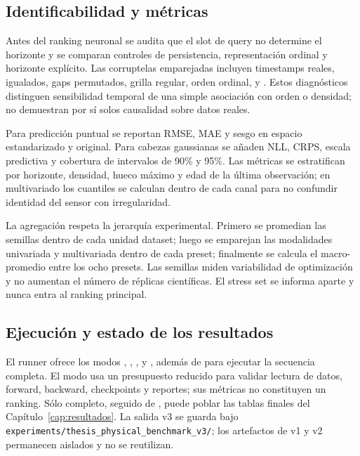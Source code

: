 \subsection{Identificabilidad y métricas}

Antes del ranking neuronal se audita que el slot de query no determine el horizonte y se comparan controles de persistencia, representación ordinal y horizonte explícito. Las corruptelas emparejadas incluyen timestamps reales, igualados, gaps permutados, grilla regular, orden ordinal,  y . Estos diagnósticos distinguen sensibilidad temporal de una simple asociación con orden o densidad; no demuestran por sí solos causalidad sobre datos reales.

Para predicción puntual se reportan RMSE, MAE y sesgo en espacio estandarizado y original. Para cabezas gaussianas se añaden NLL, CRPS, escala predictiva y cobertura de intervalos de 90\% y 95\%. Las métricas se estratifican por horizonte, densidad, hueco máximo y edad de la última observación; en multivariado los cuantiles se calculan dentro de cada canal para no confundir identidad del sensor con irregularidad.

La agregación respeta la jerarquía experimental. Primero se promedian las semillas dentro de cada unidad dataset; luego se emparejan las modalidades univariada y multivariada dentro de cada preset; finalmente se calcula el macro-promedio entre los ocho presets. Las semillas miden variabilidad de optimización y no aumentan el número de réplicas científicas. El stress set se informa aparte y nunca entra al ranking principal.

\subsection{Ejecución y estado de los resultados}

El runner ofrece los modos , , ,  y , además de  para ejecutar la secuencia completa. El modo  usa un presupuesto reducido para validar lectura de datos, forward, backward, checkpoints y reportes; sus métricas no constituyen un ranking. Sólo  completo, seguido de , puede poblar las tablas finales del Capítulo~\ref{cap:resultados}. La salida v3 se guarda bajo \nolinkurl{experiments/thesis_physical_benchmark_v3/}; los artefactos de v1 y v2 permanecen aislados y no se reutilizan.

